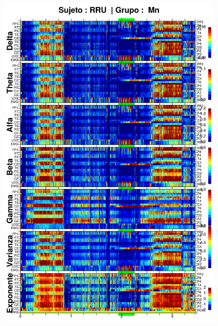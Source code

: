 \begin{figure}
\centering
\includegraphics[width=0.9\linewidth]
{./img_resultados/RRMNS_espectral_total.png} 
\end{figure}

